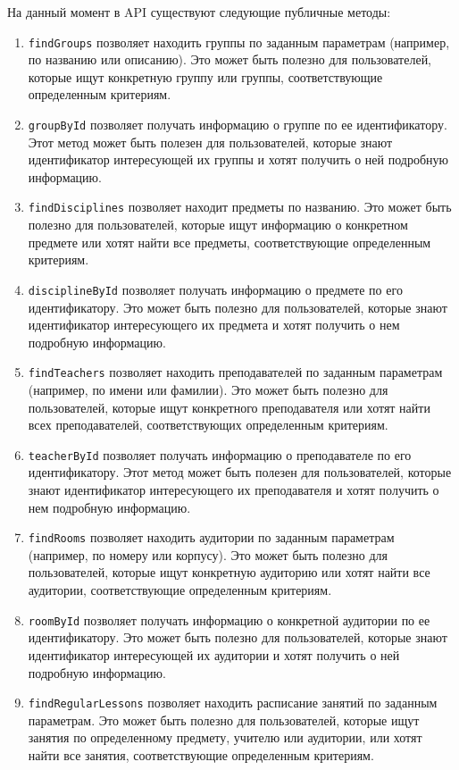 На данный момент в API существуют следующие публичные методы:
\begin{enumerate}
\item \texttt{findGroups} позволяет находить группы по заданным параметрам (например, по названию или описанию). Это может быть полезно для пользователей, которые ищут конкретную группу или группы, соответствующие определенным критериям.
\item \texttt{groupById} позволяет получать информацию о группе по ее идентификатору. Этот метод может быть полезен для пользователей, которые знают идентификатор интересующей их группы и хотят получить о ней подробную информацию.
\item \texttt{findDisciplines} позволяет находит предметы по названию. Это может быть полезно для пользователей, которые ищут информацию о конкретном предмете или хотят найти все предметы, соответствующие определенным критериям.
\item \texttt{disciplineById} позволяет получать информацию о предмете по его идентификатору. Это может быть полезно для пользователей, которые знают идентификатор интересующего их предмета и хотят получить о нем подробную информацию.
\item \texttt{findTeachers} позволяет находить преподавателей по заданным параметрам (например, по имени или фамилии). Это может быть полезно для пользователей, которые ищут конкретного преподавателя или хотят найти всех преподавателей, соответствующих определенным критериям.
\item \texttt{teacherById} позволяет получать информацию о преподавателе по его идентификатору. Этот метод может быть полезен для пользователей, которые знают идентификатор интересующего их преподавателя и хотят получить о нем подробную информацию.
\item \texttt{findRooms} позволяет находить аудитории по заданным параметрам (например, по номеру или корпусу). Это может быть полезно для пользователей, которые ищут конкретную аудиторию или хотят найти все аудитории, соответствующие определенным критериям.
\item \texttt{roomById} позволяет получать информацию о конкретной аудитории по ее идентификатору. Это может быть полезно для пользователей, которые знают идентификатор интересующей их аудитории и хотят получить о ней подробную информацию.
\item \texttt{findRegularLessons} позволяет находить расписание занятий по заданным параметрам. Это может быть полезно для пользователей, которые ищут занятия по определенному предмету, учителю или аудитории, или хотят найти все занятия, соответствующие определенным критериям.

\end{enumerate}
